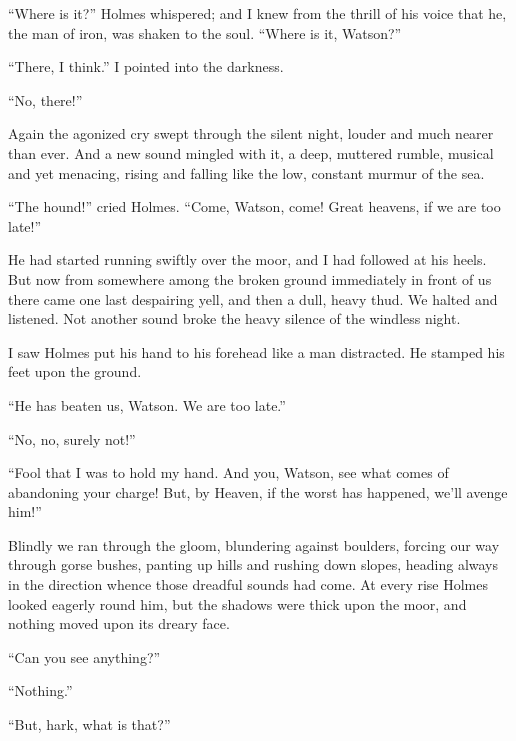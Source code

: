 \documentclass[paper=a5,BCOR=7mm,twoside,DIV=calc,12pt,usegeometry,openany,chapterprefix,endperiod,headings=big]{scrbook} %
\begin{document}
\enquote{Where is it?} Holmes whispered; and I knew from the thrill of his voice that he, the man of iron, was shaken to the soul. \enquote{Where is it, Watson?}

\enquote{There, I think.} I pointed into the darkness.

\enquote{No, there!}

Again the agonized cry swept through the silent night, louder and much nearer than ever. And a new sound mingled with it, a deep, muttered rumble, musical and yet menacing, rising and falling like the low, constant murmur of the sea.

\enquote{The hound!} cried Holmes. \enquote{Come, Watson, come! Great heavens, if we are too late!}

He had started running swiftly over the moor, and I had followed at his heels. But now from somewhere among the broken ground immediately in front of us there came one last despairing yell, and then a dull, heavy thud. We halted and listened. Not another sound broke the heavy silence of the windless night.

I saw Holmes put his hand to his forehead like a man distracted. He stamped his feet upon the ground.

\enquote{He has beaten us, Watson. We are too late.}

\enquote{No, no, surely not!}

\enquote{Fool that I was to hold my hand. And you, Watson, see what comes of abandoning your charge! But, by Heaven, if the worst has happened, we'll avenge him!}

Blindly we ran through the gloom, blundering against boulders, forcing our way through gorse bushes, panting up hills and rushing down slopes, heading always in the direction whence those dreadful sounds had come. At every rise Holmes looked eagerly round him, but the shadows were thick upon the moor, and nothing moved upon its dreary face.

\enquote{Can you see anything?}

\enquote{Nothing.}

\enquote{But, hark, what is that?}

\end{document}
